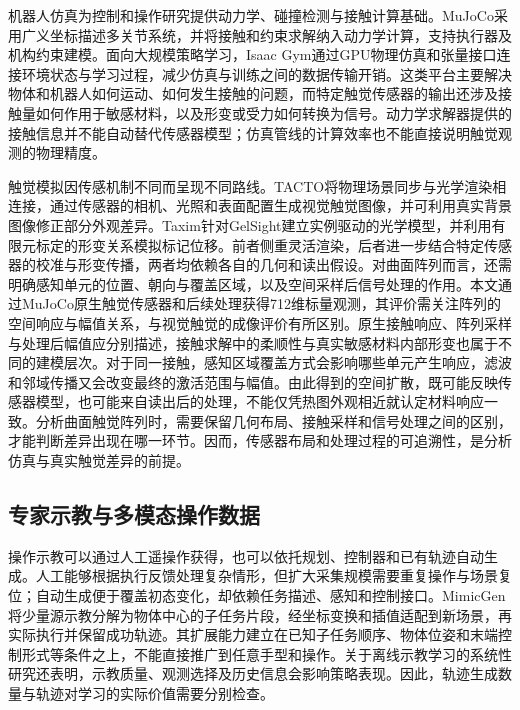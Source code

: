 机器人仿真为控制和操作研究提供动力学、碰撞检测与接触计算基础。MuJoCo采用广义坐标描述多关节系统，并将接触和约束求解纳入动力学计算，支持执行器及机构约束建模\cite{todorov2012mujoco}。面向大规模策略学习，Isaac Gym通过GPU物理仿真和张量接口连接环境状态与学习过程，减少仿真与训练之间的数据传输开销\cite{makoviychuk2021isaacgym}。这类平台主要解决物体和机器人如何运动、如何发生接触的问题，而特定触觉传感器的输出还涉及接触量如何作用于敏感材料，以及形变或受力如何转换为信号。动力学求解器提供的接触信息并不能自动替代传感器模型；仿真管线的计算效率也不能直接说明触觉观测的物理精度。

触觉模拟因传感机制不同而呈现不同路线。TACTO将物理场景同步与光学渲染相连接，通过传感器的相机、光照和表面配置生成视觉触觉图像，并可利用真实背景图像修正部分外观差异\cite{wang2022tacto}。Taxim针对GelSight建立实例驱动的光学模型，并利用有限元标定的形变关系模拟标记位移\cite{si2022taxim}。前者侧重灵活渲染，后者进一步结合特定传感器的校准与形变传播，两者均依赖各自的几何和读出假设。对曲面阵列而言，还需明确感知单元的位置、朝向与覆盖区域，以及空间采样后信号处理的作用。本文通过MuJoCo原生触觉传感器和后续处理获得712维标量观测，其评价需关注阵列的空间响应与幅值关系，与视觉触觉的成像评价有所区别。原生接触响应、阵列采样与处理后幅值应分别描述，接触求解中的柔顺性与真实敏感材料内部形变也属于不同的建模层次。对于同一接触，感知区域覆盖方式会影响哪些单元产生响应，滤波和邻域传播又会改变最终的激活范围与幅值。由此得到的空间扩散，既可能反映传感器模型，也可能来自读出后的处理，不能仅凭热图外观相近就认定材料响应一致。分析曲面触觉阵列时，需要保留几何布局、接触采样和信号处理之间的区别，才能判断差异出现在哪一环节。因而，传感器布局和处理过程的可追溯性，是分析仿真与真实触觉差异的前提。

\subsection{专家示教与多模态操作数据}
\label{subsec:demonstrations_multimodal_data}

操作示教可以通过人工遥操作获得，也可以依托规划、控制器和已有轨迹自动生成。人工能够根据执行反馈处理复杂情形，但扩大采集规模需要重复操作与场景复位；自动生成便于覆盖初态变化，却依赖任务描述、感知和控制接口。MimicGen将少量源示教分解为物体中心的子任务片段，经坐标变换和插值适配到新场景，再实际执行并保留成功轨迹\cite{mandlekar2023mimicgen}。其扩展能力建立在已知子任务顺序、物体位姿和末端控制形式等条件之上，不能直接推广到任意手型和操作。关于离线示教学习的系统性研究还表明，示教质量、观测选择及历史信息会影响策略表现\cite{mandlekar2022demonstrations}。因此，轨迹生成数量与轨迹对学习的实际价值需要分别检查。

